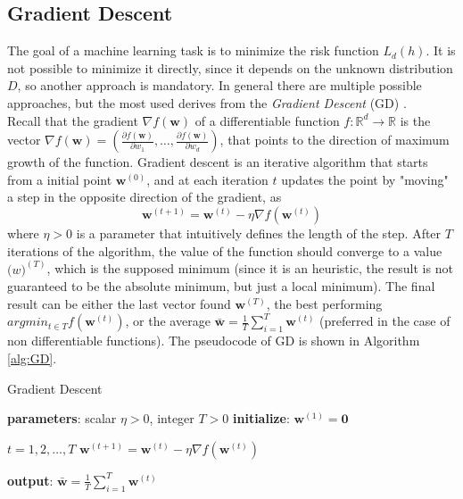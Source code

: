 \subsection{Gradient Descent}

The goal of a machine learning task is to minimize the risk function $L_d(h)$. It is not possible to minimize it directly, since it depends on the unknown distribution $D$, so another approach is mandatory. In general there are multiple possible approaches, but the most used derives from the \textit{Gradient Descent} (GD) \cite{article-gs-sgd}. \\
Recall that the gradient $\nabla f(\mathbf{w})$ of a differentiable function $f: \mathbb{R}^d \rightarrow \mathbb{R}$ is the vector  $\nabla f(\mathbf{w}) = \left( \frac{\partial f(\mathbf{w})}{\partial w_1}, \dots, \frac{\partial f(\mathbf{w})}{\partial w_d} \right)$, that points to the direction of maximum growth of the function. Gradient descent is an iterative algorithm that starts from a initial point $\mathbf{w}^{(0)}$, and at each iteration $t$ updates the point by "moving" a step in the opposite direction of the gradient, as
\[ \mathbf{w}^{(t+1)} = \mathbf{w}^{(t)} - \eta \nabla f(\mathbf{w}^{(t)}) \]
where $\eta > 0$ is a parameter that intuitively defines the length of the step. After $T$ iterations of the algorithm, the value of the function should converge to a value $\mathbf(w)^{(T)}$, which is the supposed minimum (since it is an heuristic, the result is not guaranteed to be the absolute minimum, but just a local minimum). The final result can be either the last vector found $\mathbf{w}^{(T)}$, the best performing $argmin_{t \in T} f(\mathbf{w}^{(t)})$, or the average $\mathbf{\bar{w}} = \frac{1}{T} \sum_{i=1}^{T} \mathbf{w}^{(t)}$ (preferred in the case of non differentiable functions). The pseudocode of GD is shown in Algorithm \ref{alg:GD}.

\begin{algorithm}
\caption{Gradient Descent}\label{alg:GD}
\begin{algorithmic}[1]
	\State \textbf{parameters}: scalar $\eta > 0$, integer $T>0$
	\State \textbf{initialize}: $\mathbf{w}^{(1)} = \mathbf{0}$
	
	\For $t = 1, 2, \dots , T$
	\State $\mathbf{w}^{(t+1)} = \mathbf{w}^{(t)} - \eta \nabla f(\mathbf{w}^{(t)})$
	\EndFor
	
	\State \textbf{output}: $\mathbf{\bar{w}} = \frac{1}{T} \sum_{i=1}^{T} \mathbf{w}^{(t)}$
\end{algorithmic}
\end{algorithm}


